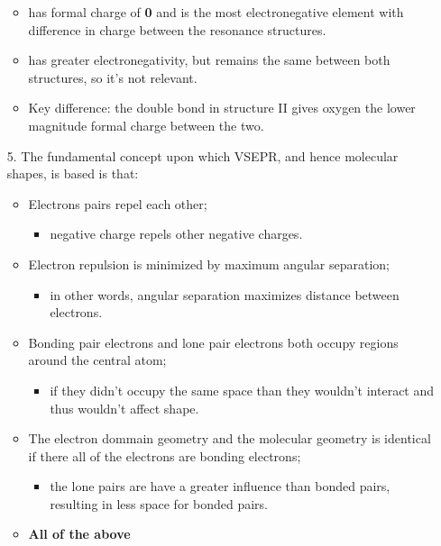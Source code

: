 \documentclass[12pt,a4paper]{article}
\begin{document}
\begin{itemize}
\begin{itemize}
            \item {} has formal charge of \textbf{0} and is the 
            {\color{neg}most electronegative} element with difference in charge between the resonance structures.
            \item {} has greater electronegativity, but remains the same between both structures, so it's not relevant.
            \item Key difference: the double bond in structure II gives oxygen the {\color{o-Sun}lower magnitude} formal charge between the two.
        \end{itemize}
    \item[5.] The fundamental concept upon which VSEPR, and hence molecular shapes, is based is that:
        \begin{itemize}
            \item Electrons pairs repel each other;
                \begin{itemize}
                    \item negative charge repels other negative charges.
                \end{itemize}
            \item Electron repulsion is minimized by maximum angular separation; 
                \begin{itemize}
                    \item in other words, angular separation maximizes distance between electrons.
                \end{itemize}
            \item Bonding pair electrons and lone pair electrons both occupy regions around the central atom;
                \begin{itemize}
                    \item if they didn't occupy the same space than they wouldn't interact and thus wouldn't affect shape.
                \end{itemize}
            \item The electron dommain geometry and the molecular geometry is identical if there all of the electrons are bonding electrons;
                \begin{itemize}
                    \item the lone pairs are have a greater influence than bonded pairs, resulting in less space for bonded pairs.
                \end{itemize}
            \item \textbf{All of the above}

\end{itemize}
\end{itemize}
\end{document}

